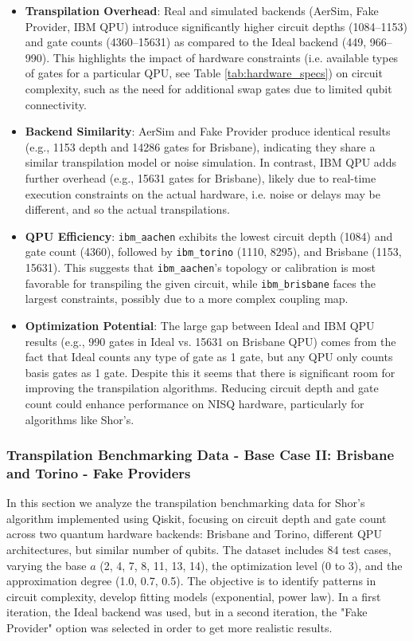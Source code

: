 \documentclass[conference,twoside]{IEEEtran}
\begin{document}
\begin{itemize}
    \item \textbf{Transpilation Overhead}: Real and simulated backends (AerSim, Fake Provider, IBM QPU) introduce significantly higher circuit depths (1084--1153) and gate counts (4360--15631) as compared to the Ideal backend (449, 966--990). This highlights the impact of hardware constraints (i.e. available types of gates for a particular QPU, see Table \ref{tab:hardware_specs}) on circuit complexity, such as the need for additional swap gates due to limited qubit connectivity.
    \item \textbf{Backend Similarity}: AerSim and Fake Provider produce identical results (e.g., 1153 depth and 14286 gates for Brisbane), indicating they share a similar transpilation model or noise simulation. In contrast, IBM QPU adds further overhead (e.g., 15631 gates for Brisbane), likely due to real-time execution constraints on the actual hardware, i.e. noise or delays may be different, and so the actual transpilations.
    \item \textbf{QPU Efficiency}: \texttt{ibm\_aachen} exhibits the lowest circuit depth (1084) and gate count (4360), followed by \texttt{ibm\_torino} (1110, 8295), and Brisbane (1153, 15631). This suggests that \texttt{ibm\_aachen}'s topology or calibration is most favorable for transpiling the given circuit, while \texttt{ibm\_brisbane} faces the largest constraints, possibly due to a more complex coupling map.    
    \item \textbf{Optimization Potential}: The large gap between Ideal and IBM QPU results (e.g., 990 gates in Ideal vs. 15631 on Brisbane QPU) comes from the fact that Ideal counts any type of gate as 1 gate, but any QPU only counts basis gates as 1 gate. Despite this it seems that there is significant room for improving the transpilation algorithms. Reducing circuit depth and gate count could enhance performance on NISQ hardware, particularly for algorithms like Shor's.
\end{itemize}

\subsubsection{Transpilation Benchmarking Data - Base Case II: Brisbane and Torino - Fake Providers}
In this section we analyze the transpilation benchmarking data for Shor's algorithm implemented using Qiskit, focusing on circuit depth and gate count across two quantum hardware backends: Brisbane and Torino, different QPU architectures, but similar number of qubits. The dataset includes 84 test cases, varying the base $a$ (2, 4, 7, 8, 11, 13, 14), the optimization level (0 to 3), and the approximation degree (1.0, 0.7, 0.5). The objective is to identify patterns in circuit complexity, develop fitting  models (exponential, power law). In a first iteration, the Ideal backend was used, but in a second iteration, the "Fake Provider" option was selected in order to get more realistic results.
\end{document}
